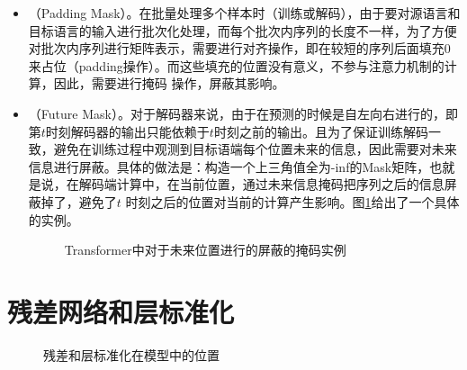 \begin{itemize}
\vspace{0.5em}
\item {\small{}}（Padding Mask）。在批量处理多个样本时（训练或解码），由于要对源语言和目标语言的输入进行批次化处理，而每个批次内序列的长度不一样，为了方便对批次内序列进行矩阵表示，需要进行对齐操作，即在较短的序列后面填充0来占位（padding操作）。而这些填充的位置没有意义，不参与注意力机制的计算，因此，需要进行掩码 操作，屏蔽其影响。
\vspace{0.5em}
\item {\small{}}（Future Mask）。对于解码器来说，由于在预测的时候是自左向右进行的，即第$t$时刻解码器的输出只能依赖于$t$时刻之前的输出。且为了保证训练解码一致，避免在训练过程中观测到目标语端每个位置未来的信息，因此需要对未来信息进行屏蔽。具体的做法是：构造一个上三角值全为-inf的Mask矩阵，也就是说，在解码端计算中，在当前位置，通过未来信息掩码把序列之后的信息屏蔽掉了，避免了$t$ 时刻之后的位置对当前的计算产生影响。图\ref{fig:12-13}给出了一个具体的实例。

\begin{figure}[htp]
\centering

\caption{Transformer中对于未来位置进行的屏蔽的掩码实例}
\label{fig:12-13}
\end{figure}

\vspace{0.5em}
\end{itemize}

\sectionnewpage
\section{残差网络和层标准化}

\begin{figure}[htp]
\centering

\caption{残差和层标准化在模型中的位置}
\label{fig:12-14}
\end{figure}

